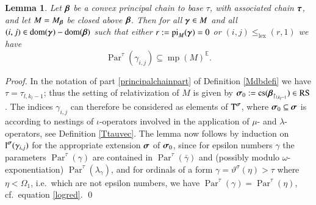 \documentclass[3p,10pt,times]{elsarticle}
\newcommand{\be}{\beta}
\newcommand{\bevec}{{\vec{\be}}}
\newcommand{\ga}{\gamma}
\newcommand{\gabar}{\bar{\ga}}
\newcommand{\gavec}{{\vec{\ga}}}
\newcommand{\la}{\lambda}
\newcommand{\Om}{\Omega}
\newcommand{\sivec}{{\vec{\si}}}
\newcommand{\tauvec}{{\vec{\tau}}}
\newcommand{\si}{\sigma}
\newcommand{\tht}{\vartheta}
\newcommand{\Ez}{{\mathbb E}}
\newcommand{\kglex}{\le_\mathrm{\scriptscriptstyle{lex}}}
\newcommand{\Tsivec}{{\operatorname{T}^\sivec}}
\newcommand{\lsivec}{{\operatorname{l}^\sivec}}
\newcommand{\laga}{{\la_\ga}}
\newcommand{\Part}{\operatorname{Par}^\tau}
\newtheorem{lem}[theo]{Lemma}
\newcommand{\cs}{{\mathrm{cs}}}
\newcommand{\RS}{\mathrm{RS}}
\newcommand{\dom}{\mathrm{dom}}
\newcommand{\gacp}[1]{{\ga_{#1}}}
\newcommand{\taucp}[1]{{\tau_{#1}}}
\newcommand{\maxparam}{\operatorname{mp}}
\newcommand{\parind}{\operatorname{pi}}
\def\vec#1{\mathchoice{\mbox{\boldmath$\displaystyle#1$}}
{\mbox{\boldmath$\textstyle#1$}}
{\mbox{\boldmath$\scriptstyle#1$}}
{\mbox{\boldmath$\scriptscriptstyle#1$}}}
\begin{document}
\begin{lem}\label{closedparamlem}
Let $\bevec$ be a convex principal chain to base $\tau$, with associated chain $\tauvec$, and let $M=M_\bevec$ be closed above $\bevec$.
Then for all $\gavec\in M$ and all $(i,j)\in\dom(\gavec)-\dom(\bevec)$ such that either $r:=\parind_{M}(\gavec)=0$ or
$(i,j)\kglex(r,1)$ we have \[\Part(\gacp{i,j})\subseteq\maxparam(M)^\Ez.\] 
\end{lem}
\begin{proof} In the notation of part \ref{principalchainpart} of Definition \ref{Mdbdefi} we have $\tau=\taucp{l,k_l-1}$; thus the setting of 
relativization of $M$ is given by $\sivec_0:=\cs(\bevec_{\restriction_{l,k_l-1}})\in\RS$. The indices $\gacp{i,j}$ can therefore
be considered as elements of $\Tsivec$, where $\sivec_0\subseteq\sivec$ is according to nestings of $\iota$-operators involved in
the application of $\mu$- and $\la$-operators, see Definition \ref{Ttauvec}.
The lemma now follows by induction on $\lsivec(\gacp{i,j})$ for the appropriate extension $\sivec$ of $\sivec_0$, since for epsilon numbers
$\ga$ the parameters $\Part(\ga)$ are contained in $\Part(\gabar)$ and (possibly modulo $\omega$-exponentiation) $\Part(\laga)$, 
and for ordinals of a form $\ga=\tht^\si(\eta)>\tau$ where $\eta<\Om_1$, 
i.e.\ which are not epsilon numbers, we have $\Part(\ga)=\Part(\eta)$, cf.\ equation \ref{logred}.
\qed \end{proof}
\end{document}

